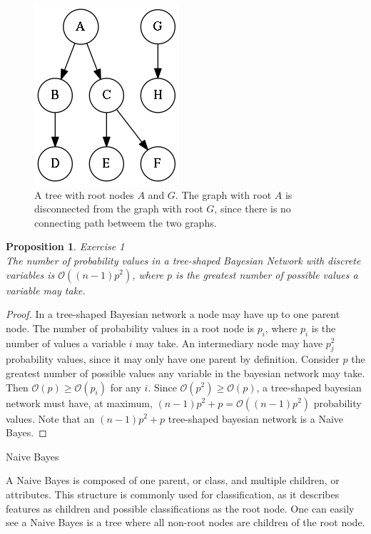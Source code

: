\documentclass{amsart}
\makeatletter
\def\subsection{\@startsection{subsection}{3}%
  \z@{.5\linespacing\@plus.7\linespacing}{.1\linespacing}%
  {\normalfont\itshape}}
\theoremstyle{plain}
\newtheorem{proposition}{Proposition}
\makeatother
\begin{document}
\begin{figure}[h]
  \captionsetup{justification=centering}
  \centering\includegraphics[scale=0.5]{graphs/tree.png}
  \caption{A tree with root nodes $A$ and $G$. The graph with root $A$ is disconnected from the
  graph with root $G$, since there is no connecting path betweem the two graphs.}
\end{figure}

\begin{proposition} Exercise 1\\
  The number of probability values in a tree-shaped Bayesian Network with discrete variables is
  $\mathcal{O}((n-1)p^2)$, where $p$ is the greatest number of possible values a variable may take.
\end{proposition}

\begin{proof}
  In a tree-shaped Bayesian network a node may have up to one parent node. The number of
  probability values in a root node is $p_i$, where $p_i$ is the number of values a variable $i$
  may take. An intermediary node may have $p_j^2$ probability values, since it may only have one
  parent by definition. Consider $p$ the greatest number of possible values any variable in the
  bayesian network may take. Then $\mathcal{O}(p)\geq\mathcal{O}(p_i)$ for any $i$. Since
  $\mathcal{O}(p^2)\geq\mathcal{O}(p)$, a tree-shaped bayesian network must have, at maximum,
  $(n-1)p^2+p=\mathcal{O}((n-1)p^2)$ probability values. Note that an $(n-1)p^2+p$ tree-shaped
  bayesian network is a Naive Bayes.
\end{proof}

\subsection{Naive Bayes}

A Naive Bayes is composed of one parent, or class, and multiple children, or attributes. This
structure is commonly used for classification, as it describes features as children and possible
classifications as the root node. One can easily see a Naive Bayes is a tree where all non-root
nodes are children of the root node.
\end{document}
